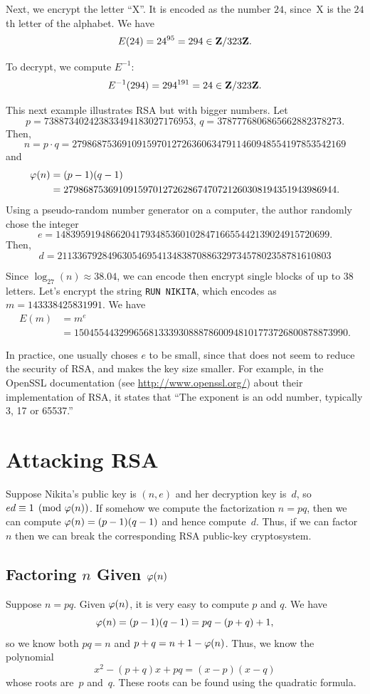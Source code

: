 Next, we encrypt the letter ``X''.  It is encoded as the number
$24$, since~X is the $24$th letter of the alphabet.
We have
$$
  E(24) = 24^{95} = 294 \in \mathbf{Z}/323\mathbf{Z}{}.
$$

To decrypt, we compute $E^{-1}$:
$$
  E^{-1}(294) = 294^{191} = 24 \in \mathbf{Z}/323\mathbf{Z}{}.
$$

This next example illustrates RSA but with bigger numbers.
Let
$$
 p=738873402423833494183027176953, \, q=3787776806865662882378273.
$$
Then,
$$
 n=p\cdot q = 2798687536910915970127263606347911460948554197853542169
$$
and
\begin{align*}
\varphi(n)&=(p-1)(q-1)\\
&=
 2798687536910915970127262867470721260308194351943986944.
\end{align*}
Using a pseudo-random number generator on a computer, the
author randomly chose the integer
$$
  e=1483959194866204179348536010284716655442139024915720699.
$$
Then,
$$
  d = 2113367928496305469541348387088632973457802358781610803
$$

Since $\log_{27}(n) \approx 38.04$, we can encode then
encrypt single blocks of up to 38 letters.  Let's encrypt
the string {\tt RUN NIKITA},
which encodes as $m=143338425831991$.  We have
\begin{align*}
  E(m) &= m^e \\
& = 1504554432996568133393088878600948101773726800878873990.
\end{align*}
\begin{remark}
In practice, one usually choses $e$ to be small, since that
does not seem to reduce the security of RSA, and makes the
key size smaller.  For example, in the OpenSSL documentation
(see \url{http://www.openssl.org/})
about their implementation of RSA, it states that
``The exponent is an odd number, typically 3, 17 or 65537.''
\end{remark}


\section{Attacking RSA}
Suppose Nikita's public key is $(n,e)$ and her
decryption key is~$d$, so $ed\equiv 1\pmod{\varphi(n)}$.  If somehow we
compute the factorization $n=pq$, then we can compute
$\varphi(n)=(p-1)(q-1)$ and hence compute~$d$.  Thus, if we can factor~$n$
then we can break the corresponding RSA public-key cryptosystem.

\subsection{Factoring $n$ Given $\varphi(n)$}\label{sec:phin}
Suppose $n=pq$.  Given $\varphi(n)$, it is very easy to
compute $p$ and $q$.  We have
$$
  \varphi(n) = (p-1)(q-1) = pq-(p+q)+1,
$$
so we know both $pq=n$ and $p+q = n+1 - \varphi(n)$.
Thus, we know the polynomial
$$
   x^2 - (p+q)x + pq = (x-p)(x-q)
$$
whose roots are~$p$ and~$q$.
These roots can be found using the quadratic formula.

